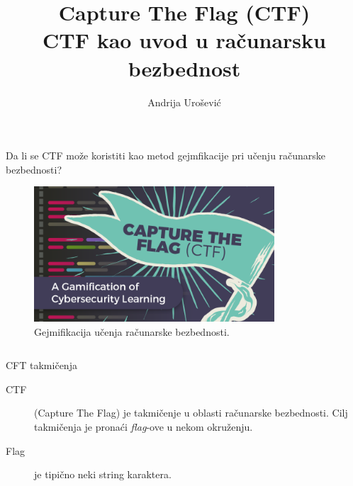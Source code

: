\documentclass{beamer}
\author[andrija.urosevic@protonmail.com]{Andrija Urošević}
\title{Capture The Flag (CTF)\\  CTF kao uvod u računarsku bezbednost}
\institute{Univerzitet u Beogradu\\ Matematički fakultet}
\begin{document}
\begin{frame}[fragile]
    \centering


    \begin{block}
        {Da li se CTF može koristiti kao metod gejmfikacije pri učenju
        računarske bezbednosti?}
        \begin{figure}
            \centering
            \includegraphics[width=0.8\textwidth]{Slike/ctf_gami.png}
            \caption{Gejmifikacija učenja računarske
            bezbednosti.}\label{fig:ctfgami}
        \end{figure}
    \end{block}


    \begin{columns}[T]

        \begin{column}{.46\textwidth}


            \begin{block}{CFT takmičenja}
                \begin{description}
                    \item [CTF] (Capture The Flag) je takmičenje u oblasti
                        računarske bezbednosti. Cilj takmičenja je pronaći
                        \emph{flag}-ove u nekom okruženju.
                    \item [Flag] je tipično neki string karaktera.
                \end{description}
            \end{block}


\end{column}
\end{columns}
\end{frame}
\end{document}
